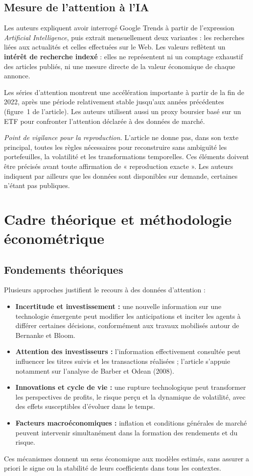 \documentclass[11pt,a4paper]{article}
\newcommand{\notereproduction}{\textit{Point de vigilance pour la reproduction.} }
\begin{document}
\subsection{Mesure de l'attention à l'IA}
Les auteurs expliquent avoir interrogé Google Trends à partir de l'expression \textit{Artificial Intelligence}, puis extrait mensuellement deux variantes : les recherches liées aux actualités et celles effectuées sur le Web. Les valeurs reflètent un \textbf{intérêt de recherche indexé} : elles ne représentent ni un comptage exhaustif des articles publiés, ni une mesure directe de la valeur économique de chaque annonce.

Les séries d'attention montrent une accélération importante à partir de la fin de 2022, après une période relativement stable jusqu'aux années précédentes (figure~1 de l'article). Les auteurs utilisent aussi un proxy boursier basé sur un ETF pour confronter l'attention déclarée à des données de marché.

\notereproduction L'article ne donne pas, dans son texte principal, toutes les règles nécessaires pour reconstruire sans ambiguïté les portefeuilles, la volatilité et les transformations temporelles. Ces éléments doivent être précisés avant toute affirmation de « reproduction exacte ». Les auteurs indiquent par ailleurs que les données sont disponibles sur demande, certaines n'étant pas publiques.

\section{Cadre théorique et méthodologie économétrique}
\subsection{Fondements théoriques}
Plusieurs approches justifient le recours à des données d'attention :
\begin{itemize}
\item \textbf{Incertitude et investissement :} une nouvelle information sur une technologie émergente peut modifier les anticipations et inciter les agents à différer certaines décisions, conformément aux travaux mobilisés autour de Bernanke et Bloom.
\item \textbf{Attention des investisseurs :} l'information effectivement consultée peut influencer les titres suivis et les transactions réalisées ; l'article s'appuie notamment sur l'analyse de Barber et Odean (2008).
\item \textbf{Innovations et cycle de vie :} une rupture technologique peut transformer les perspectives de profits, le risque perçu et la dynamique de volatilité, avec des effets susceptibles d'évoluer dans le temps.
\item \textbf{Facteurs macroéconomiques :} inflation et conditions générales de marché peuvent intervenir simultanément dans la formation des rendements et du risque.
\end{itemize}
Ces mécanismes donnent un sens économique aux modèles estimés, sans assurer a priori le signe ou la stabilité de leurs coefficients dans tous les contextes.
\end{document}
